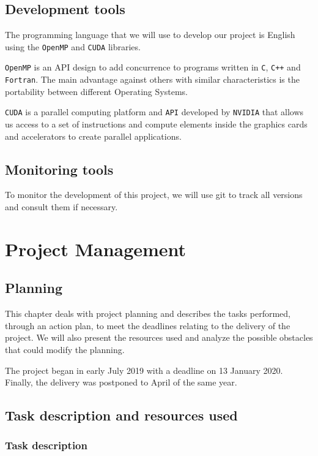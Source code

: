\documentclass[titlepage,12pt]{report}
\begin{document}
\section{Development tools}

The programming language that we will use to develop our project is English using the \texttt{OpenMP} and \texttt{CUDA} libraries.

\texttt{OpenMP} is an API design to add concurrence to programs written in \texttt{C}, \texttt{C++} and \texttt{Fortran}. The main advantage against others with similar characteristics is the portability between different Operating Systems.

\texttt{CUDA} is a parallel computing platform and \texttt{API} developed by \texttt{NVIDIA} that allows us access to a set of instructions and compute elements inside the graphics cards and accelerators to create parallel applications.

\section{Monitoring tools}

To monitor the development of this project, we will use git to track all versions and consult them if necessary.

\chapter{Project Management}

\section{Planning}

This chapter deals with project planning and describes the tasks performed, through an action plan, to meet the deadlines relating to the delivery of the project. We will also present the resources used and analyze the possible obstacles that could modify the planning.

The project began in early July 2019 with a deadline on 13 January 2020. Finally, the delivery was postponed to April of the same year.

\section{Task description and resources used}

\subsection{Task description}
\end{document}
